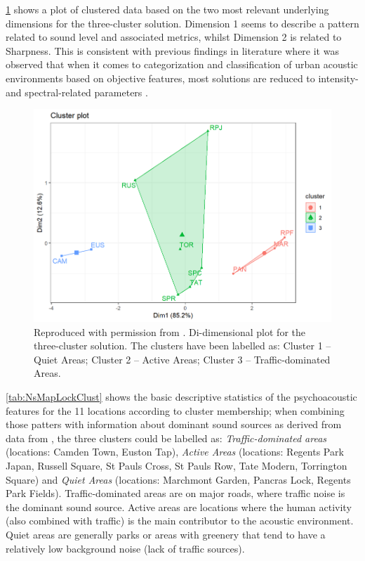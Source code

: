 \cref{fig:NsMapLockBiplot} shows a plot of clustered data based on the two most relevant underlying dimensions for the three-cluster solution. Dimension 1 seems to describe a pattern related to sound level and associated metrics, whilst Dimension 2 is related to Sharpness. This is consistent with previous findings in literature where it was observed that when it comes to categorization and classification of urban acoustic environments based on objective features, most solutions are reduced to intensity- and spectral-related parameters . 

\begin{figure}[h!]
  \centering
  \includegraphics[width=\textwidth]{Figures/NoiseMappingLockdown Fig 7.png}  
  \caption{Reproduced with permission from \citet{Aletta2020Assessing}. Di-dimensional plot for the three-cluster solution. The clusters have been labelled as: Cluster 1 -- Quiet Areas; Cluster 2 -- Active Areas; Cluster 3 -- Traffic-dominated Areas. \label{fig:NsMapLockBiplot}}
\end{figure}

\cref{tab:NsMapLockClust} shows the basic descriptive statistics of the psychoacoustic features for the 11 locations according to cluster membership; when combining those patters with information about dominant sound sources as derived from data from , the three clusters could be labelled as: \emph{Traffic-dominated areas} (locations: Camden Town, Euston Tap), \emph{Active Areas} (locations: Regents Park Japan, Russell Square, St Pauls Cross, St Pauls Row, Tate Modern, Torrington Square) and \emph{Quiet Areas} (locations: Marchmont Garden, Pancras Lock, Regents Park Fields). Traffic-dominated areas are on major roads, where traffic noise is the dominant sound source. Active areas are locations where the human activity (also combined with traffic) is the main contributor to the acoustic environment. Quiet areas are generally parks or areas with greenery that tend to have a relatively low background noise (lack of traffic sources).

